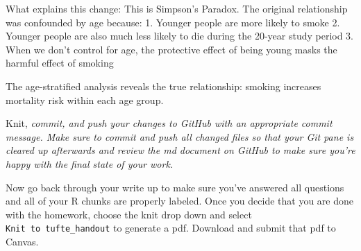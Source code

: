 \documentclass[
]{article}
\begin{document}
What explains this change: This is Simpson's Paradox. The original
relationship was confounded by age because: 1. Younger people are more
likely to smoke 2. Younger people are also much less likely to die
during the 20-year study period 3. When we don't control for age, the
protective effect of being young masks the harmful effect of smoking

The age-stratified analysis reveals the true relationship: smoking
increases mortality risk within each age group.

Knit, \emph{commit, and push your changes to GitHub with an appropriate
commit message. Make sure to commit and push all changed files so that
your Git pane is cleared up afterwards and review the md document on
GitHub to make sure you're happy with the final state of your work.}

Now go back through your write up to make sure you've answered all
questions and all of your R chunks are properly labeled. Once you decide
that you are done with the homework, choose the knit drop down and
select \texttt{Knit\ to\ tufte\_handout} to generate a pdf. Download and
submit that pdf to Canvas.
\end{document}
